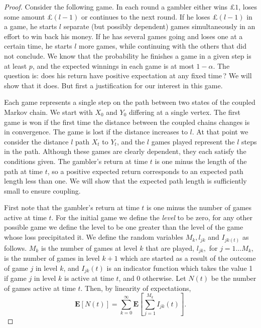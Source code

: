 \documentclass[11pt]{article}
\theoremstyle{definition}
\theoremstyle{remark}
\newcommand{\e}{\mathbf{E}}
\begin{document}
\begin{proof}
Consider the following game. In each round a gambler either wins \pounds$
1$, loses some amount \pounds$(l-1)$ or continues to the next round. If he
loses \pounds$(l-1)$ in a game, he starts $l$ separate (but possibly
dependent) games simultaneously in an effort to win back his money. If he
has several games going and loses one at a certain time, he starts $l$ more
games, while continuing with the others that did not conclude. We know that
the probability he finishes a game in a given step is at least $p$, and the
expected winnings in each game is at most $1-\alpha$. The question is: does
his return have positive expectation at any fixed time\,? We will show that
it does. But first a justification for our interest in this game.

Each game represents a single step on the path between two states
of the coupled Markov chain. We start with $X_0$ and $Y_0$
differing at a single vertex. The first game is won if the first
time the distance between the coupled chains changes is in
convergence. The game is lost if the distance increases to $l$. At
that point we consider the distance $l$ path $X_t$ to $Y_t$, and
the $l$ games played represent the $l$ steps in the path. Although
these games are clearly dependent, they each satisfy the
conditions given. The gambler's return at time $t$ is one minus the
length of the path at time $t$, so a positive expected return
corresponds to an expected path length less than one. We will show that the expected path length is sufficiently small to ensure coupling.

First note that the gambler's return at time $t$ is one minus the
number of games active at time $t$. For the initial game we define
the \emph{level} to be zero, for any other possible game we define
the level to be one greater than the level of the game whose loss
precipitated it. We define the random variables $M_k, l_{jk}$ and
$I_{jk(t)}$ as follows. $M_k$ is the number of games at level $k$
that are played, $l_{jk},$ for $j=1\ldots M_k$, is the number of
games in level $k+1$ which are started as a result of the outcome
of game $j$ in level $k$, and $I_{jk}(t)$ is an indicator function
which takes the value 1 if game $j$ in level $k$ is active at time
$t$, and 0 otherwise. Let $N(t)$ be the number of games active at
time $t$. Then, by linearity of expectations,
\begin{equation}
\label{expsum} \e[N(t)]=\sum_{k=0}^\infty \e \left[ \sum_{j=1}^{M_k}
I_{jk}(t)\right].
\end{equation}


\end{proof}
\end{document}

